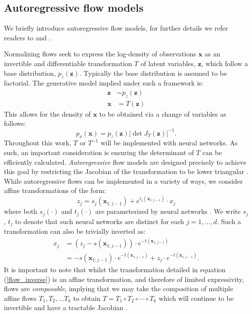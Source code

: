\documentclass[]{article}
\begin{document}
\subsection{Autoregressive flow models}

We briefly introduce autoregressive flow models, for further details we refer readers to  
\cite{papamakarios2019normalizing} and \cite{kobyzev2019normalizing}. 


Normalizing flows seek to express the log-density of observations 
$\textbf{x}$ as an invertible and differentiable 
transformation $T$ of latent variables, $\mathbf{z}$,
which follow a base distribution,  $p_{{z}}(\mathbf{z})$. Typically the base distribution is 
assumed to be factorial. 
The generative model implied under such a framework is:
\begin{align}
\mathbf{z} &\sim p_z (\mathbf{z}) \\
\mathbf{x} &= T( \mathbf{z})
\end{align}
This allows for the density of $\mathbf{x}$ to be obtained via a change of variables as follows:
\begin{equation}
p_x(\mathbf{x}) = p_{{z}}(\mathbf{z}) | \det J_T(\mathbf{z} )|^{-1}   .
\label{flow_inverse}
\end{equation} 
Throughout this work,  $T$ or $T^{-1}$ will be implemented with neural networks. As such,  an important consideration 
is ensuring the determinant of $T$ can be efficiently calculated. 
\textit{Autoregressive} flow models are designed precisely to achieve this goal by restricting the 
Jacobian of the transformation to be lower triangular \citep{huang2018neural}. 
While autoregressive flows can be implemented in a variety of ways, we consider 
affine transformations of the form:
\begin{equation}
z_j = s_j( \mathbf{x}_{1:j-1} ) + e^{t_j( \mathbf{x}_{1:j-1}  )} \cdot x_j
\end{equation}
where both $s_j(\cdot)$ and $t_j(\cdot)$ are parameterized by neural networks \citep{dinh2016density}. 
We write $s_j$, $t_j$ to denote that such neural networks are distinct for each
$j = 1, \ldots, d$. 
Such a transformation can also be trivially inverted as:
\begin{align}
x_j &= \left (z_j - s( \mathbf{x}_{1:j-1} ) \right ) \cdot  e^{-t( \mathbf{x}_{1:j-1}  )} \\
&= - s( \mathbf{x}_{1:j-1} ) \cdot  e^{-t( \mathbf{x}_{1:j-1}  )} +  z_j \cdot  e^{-t( \mathbf{x}_{1:j-1}  )} .
\label{flow_inverse_2}
\end{align}
It is important to note that whilst the transformation detailed in 
equation (\ref{flow_inverse}) is an affine transformation, and therefore of limited expressivity, 
flows are \textit{composable}, implying that we may take the composition of multiple affine flows
$T_1, T_2, \ldots T_k$  to obtain $T = T_1 \circ T_2 \circ \cdots \circ T_k $ which will continue to be 
invertible and have a tractable Jacobian \citep{papamakarios2019normalizing}.
\end{document}
